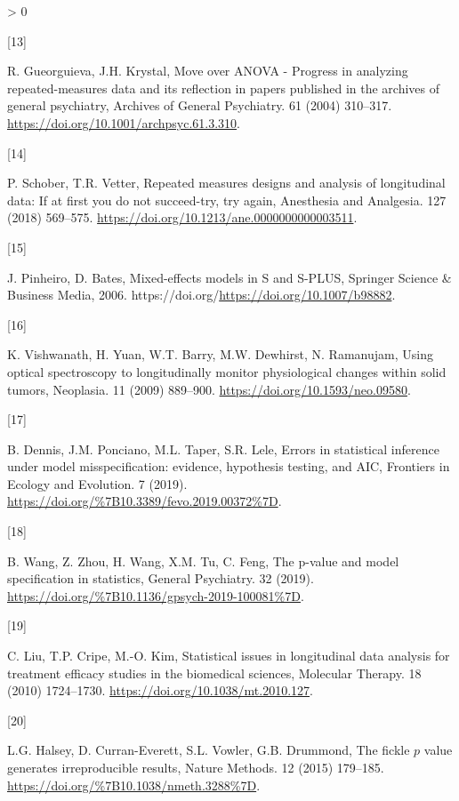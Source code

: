 \documentclass[
]{article}
\newlength{\cslhangindent}
\newlength{\csllabelwidth}
\newenvironment{CSLReferences}[2] %
 {%
  \setlength{\parindent}{0pt}
  \ifodd #1 \everypar{\setlength{\hangindent}{\cslhangindent}}\ignorespaces\fi
  \ifnum #2 > 0
  \setlength{\parskip}{#2\baselineskip}
  \fi
 }%
 {}
\newcommand{\CSLLeftMargin}[1]{\parbox[t]{\csllabelwidth}{#1}}
\newcommand{\CSLRightInline}[1]{\parbox[t]{\linewidth - \csllabelwidth}{#1}\break}
\begin{document}
\begin{CSLReferences}{0}{0}
\leavevmode\hypertarget{ref-gueorguieva2004}{}%
\CSLLeftMargin{{[}13{]} }
\CSLRightInline{R. Gueorguieva, J.H. Krystal, {Move over ANOVA - Progress in analyzing repeated-measures data and its reflection in papers published in the archives of general psychiatry}, Archives of General Psychiatry. 61 (2004) 310--317. \url{https://doi.org/10.1001/archpsyc.61.3.310}.}

\leavevmode\hypertarget{ref-schober2018}{}%
\CSLLeftMargin{{[}14{]} }
\CSLRightInline{P. Schober, T.R. Vetter, Repeated measures designs and analysis of longitudinal data: If at first you do not succeed-try, try again, Anesthesia and Analgesia. 127 (2018) 569--575. \url{https://doi.org/10.1213/ane.0000000000003511}.}

\leavevmode\hypertarget{ref-pinheiro2006}{}%
\CSLLeftMargin{{[}15{]} }
\CSLRightInline{J. Pinheiro, D. Bates, {Mixed-effects models in S and S-PLUS}, Springer Science \& Business Media, 2006. https://doi.org/\url{https://doi.org/10.1007/b98882}.}

\leavevmode\hypertarget{ref-vishwanath2009}{}%
\CSLLeftMargin{{[}16{]} }
\CSLRightInline{K. Vishwanath, H. Yuan, W.T. Barry, M.W. Dewhirst, N. Ramanujam, Using optical spectroscopy to longitudinally monitor physiological changes within solid tumors, Neoplasia. 11 (2009) 889--900. \url{https://doi.org/10.1593/neo.09580}.}

\leavevmode\hypertarget{ref-dennis2019}{}%
\CSLLeftMargin{{[}17{]} }
\CSLRightInline{B. Dennis, J.M. Ponciano, M.L. Taper, S.R. Lele, {Errors in statistical inference under model misspecification: evidence, hypothesis testing, and AIC}, {Frontiers in Ecology and Evolution}. {7} (2019). \url{https://doi.org/\%7B10.3389/fevo.2019.00372\%7D}.}

\leavevmode\hypertarget{ref-wang2019}{}%
\CSLLeftMargin{{[}18{]} }
\CSLRightInline{B. Wang, Z. Zhou, H. Wang, X.M. Tu, C. Feng, {The p-value and model specification in statistics}, {General Psychiatry}. {32} (2019). \url{https://doi.org/\%7B10.1136/gpsych-2019-100081\%7D}.}

\leavevmode\hypertarget{ref-liu2010}{}%
\CSLLeftMargin{{[}19{]} }
\CSLRightInline{C. Liu, T.P. Cripe, M.-O. Kim, Statistical issues in longitudinal data analysis for treatment efficacy studies in the biomedical sciences, Molecular Therapy. 18 (2010) 1724--1730. \url{https://doi.org/10.1038/mt.2010.127}.}

\leavevmode\hypertarget{ref-halsey2015}{}%
\CSLLeftMargin{{[}20{]} }
\CSLRightInline{L.G. Halsey, D. Curran-Everett, S.L. Vowler, G.B. Drummond, {The fickle \(p\) value generates irreproducible results}, {Nature Methods}. {12} (2015) 179--185. \url{https://doi.org/\%7B10.1038/nmeth.3288\%7D}.}


\end{CSLReferences}
\end{document}
